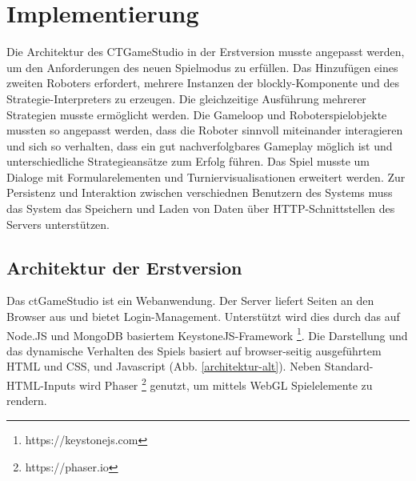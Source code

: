 \chapter{Implementierung}

Die Architektur des CTGameStudio in der Erstversion musste angepasst werden, um den Anforderungen
des neuen Spielmodus zu erfüllen. Das Hinzufügen eines zweiten Roboters erfordert, mehrere Instanzen
der blockly-Komponente und des Strategie-Interpreters zu erzeugen. Die gleichzeitige Ausführung
mehrerer Strategien musste ermöglicht werden. Die Gameloop und Roboterspielobjekte mussten so angepasst werden, dass die Roboter sinnvoll miteinander interagieren und sich so verhalten, dass ein
gut nachverfolgbares Gameplay möglich ist und unterschiedliche Strategieansätze zum Erfolg führen.
Das Spiel musste um Dialoge mit Formularelementen und Turniervisualisationen erweitert werden. Zur
Persistenz und Interaktion zwischen verschiednen Benutzern des Systems muss das System das Speichern
und Laden von Daten über HTTP-Schnittstellen des Servers unterstützen.

\section{Architektur der Erstversion}

Das ctGameStudio ist ein Webanwendung. Der Server liefert Seiten an den Browser aus und bietet
Login-Management. Unterstützt wird dies durch das auf Node.JS und MongoDB basiertem
KeystoneJS-Framework \footnote{https://keystonejs.com}. Die Darstellung und das dynamische Verhalten
des Spiels basiert auf browser-seitig ausgeführtem HTML und CSS, und Javascript (Abb.
\ref{architektur-alt}). Neben Standard-HTML-Inputs wird Phaser \footnote{https://phaser.io} genutzt,
um mittels WebGL Spielelemente zu rendern.

